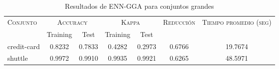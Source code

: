 \begin{table}[]
\centering
\begin{tabular}{l c c c c c c}
\hline
\multirow{2}{*}{\textsc{Conjunto}}
	& \multicolumn{2}{c}{\textsc{Accuracy}}
	& \multicolumn{2}{c}{\textsc{Kappa}}
	& \textsc{Reducción}
	& \textsc{Tiempo promedio (seg)} \\
	& Training & Test
	& Training & Test \\ 
\hline
\hline

credit-card & 0.8232 & 0.7833 & 0.4282 & 0.2973 & 0.6766 & 19.7674 \\
shuttle & 0.9972 & 0.9910 & 0.9935 & 0.9921 & 0.6265 & 48.5971 \\

\hline
\end{tabular}
\caption{Resultados de ENN-GGA para conjuntos grandes }
\label{res-grande-enn-gga}
\end{table}

